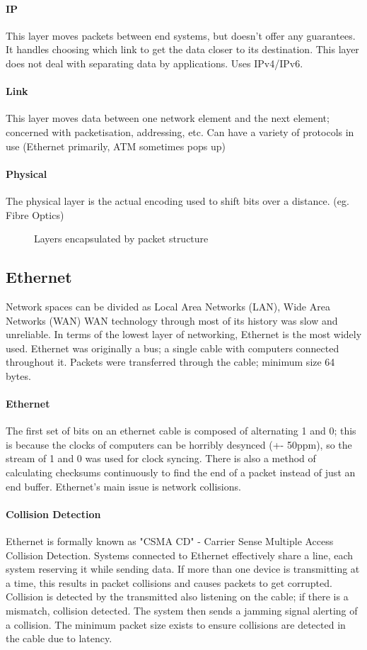 \paragraph{IP}
This layer moves packets between end systems, but doesn't offer any guarantees. It handles choosing which link to get the data closer to its destination. This layer does not deal with separating data by applications. Uses IPv4/IPv6.
\paragraph{Link}
This layer moves data between one network element and the next element; concerned with packetisation, addressing, etc. Can have a variety of protocols in use (Ethernet primarily, ATM sometimes pops up)
\paragraph{Physical}
The physical layer is the actual encoding used to shift bits over a distance. (eg. Fibre Optics)
   \begin{figure}[!htb]
	\caption{\label{fig:packet} Layers encapsulated by packet structure}
\end{figure}

\subsection{Ethernet}
Network spaces can be divided as Local Area Networks (LAN), Wide Area Networks (WAN) WAN technology through most of its history was slow and unreliable. In terms of the lowest layer of networking, Ethernet is the most widely used. Ethernet was originally a bus; a single cable with computers connected throughout it. Packets were transferred through the cable; minimum size 64 bytes.
\paragraph{Ethernet}
The first set of bits on an ethernet cable is composed of alternating 1 and 0; this is because the clocks of computers can be horribly desynced (+- 50ppm), so the stream of 1 and 0 was used for clock syncing. There is also a method of calculating checksums continuously to find the end of a packet instead of just an end buffer. Ethernet's main issue is network collisions.
\paragraph{Collision Detection}
Ethernet is formally known as "CSMA CD" - Carrier Sense Multiple Access Collision Detection. Systems connected to Ethernet effectively share a line, each system reserving it while sending data. If more than one device is transmitting at a time, this results in packet collisions and causes packets to get corrupted. Collision is detected by the transmitted also listening on the cable; if there is a mismatch, collision detected. The system then sends a jamming signal alerting of a collision. The minimum packet size exists to ensure collisions are detected in the cable due to latency.
